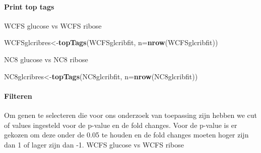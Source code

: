 \documentclass[
]{article}
\newenvironment{Shaded}{\begin{snugshade}}{\end{snugshade}}
\newcommand{\DataTypeTok}[1]{\textcolor[rgb]{0.13,0.29,0.53}{#1}}
\newcommand{\DecValTok}[1]{\textcolor[rgb]{0.00,0.00,0.81}{#1}}
\newcommand{\FloatTok}[1]{\textcolor[rgb]{0.00,0.00,0.81}{#1}}
\newcommand{\KeywordTok}[1]{\textcolor[rgb]{0.13,0.29,0.53}{\textbf{#1}}}
\newcommand{\NormalTok}[1]{#1}
\newcommand{\OperatorTok}[1]{\textcolor[rgb]{0.81,0.36,0.00}{\textbf{#1}}}
\newcommand{\StringTok}[1]{\textcolor[rgb]{0.31,0.60,0.02}{#1}}
\begin{document}
\hypertarget{print-top-tags}{%
\paragraph{Print top tags}\label{print-top-tags}}

WCFS glucose vs WCFS ribose

\begin{Shaded}
\begin{Highlighting}[]
\NormalTok{WCFSglcribres<-}\KeywordTok{topTags}\NormalTok{(WCFSglcribfit, }\DataTypeTok{n=}\KeywordTok{nrow}\NormalTok{(WCFSglcribfit))}
\end{Highlighting}
\end{Shaded}

NC8 glucose vs NC8 ribose

\begin{Shaded}
\begin{Highlighting}[]
\NormalTok{NC8glcribres<-}\KeywordTok{topTags}\NormalTok{(NC8glcribfit, }\DataTypeTok{n=}\KeywordTok{nrow}\NormalTok{(NC8glcribfit))}
\end{Highlighting}
\end{Shaded}

\hypertarget{filteren}{%
\paragraph{Filteren}\label{filteren}}

Om genen te selecteren die voor ons onderzoek van toepassing zijn hebben
we cut of values ingesteld voor de p-value en de fold changes. Voor de
p-value is er gekozen om deze onder de 0.05 te houden en de fold changes
moeten hoger zijn dan 1 of lager zijn dan -1. WCFS glucose vs WCFS
ribose

\begin{Shaded}
\end{Shaded}
\end{document}
